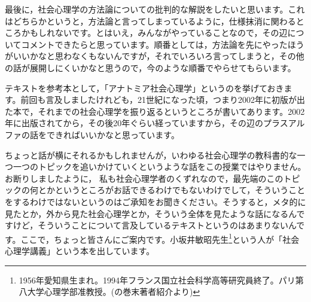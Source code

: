 \documentclass{ltjsbook}
\begin{document}
最後に，社会心理学の方法論についての批判的な解説をしたいと思います。これはどちらかというと，方法論と言ってしまっているように，仕様抹消に関わるところかもしれないです。とはいえ，みんながやっていることなので，その辺についてコメントできたらと思っています。順番としては，方法論を先にやったほうがいいかなと思わなくもないんですが，それでいろいろ言ってしまうと，その他の話が展開しにくいかなと思うので，今のような順番でやらせてもらいます。

テキストを参考本として，「アナトミア社会心理学」というのを挙げておきます\parencite{anatomia}。前回も言及しましたけれども，21世紀になった頃，つまり2002年に初版が出た本で，それまでの社会心理学を振り返るというところが書いてあります。2002年に出版されてから，その後20年ぐらい経っていますから，その辺のプラスアルファの話をできればいいかなと思っています。

ちょっと話が横にそれるかもしれませんが，いわゆる社会心理学の教科書的な一つ一つのトピックを追いかけていくというような話をこの授業ではやりません。お断りしましたように，
私も社会心理学者のくずれなので，最先端のこのトピックの何とかというところがお話できるわけでもないわけでして，そういうことをするわけではないというのはご承知をお聞きください。そうすると，メタ的に見たとか，外から見た社会心理学とか，そういう全体を見たような話になるんですけど，そういうことについて言及しているテキストというのはあまりないんです。ここで，ちょっと皆さんにご案内です。小坂井敏昭先生\footnote{1956年愛知県生まれ。1994年フランス国立社会科学高等研究員終了。パリ第八大学心理学部准教授。(\textcite{kosakai}の巻末著者紹介より)}という人が「社会心理学講義」という本を出しています\parencite{kosakai}。
\end{document}
